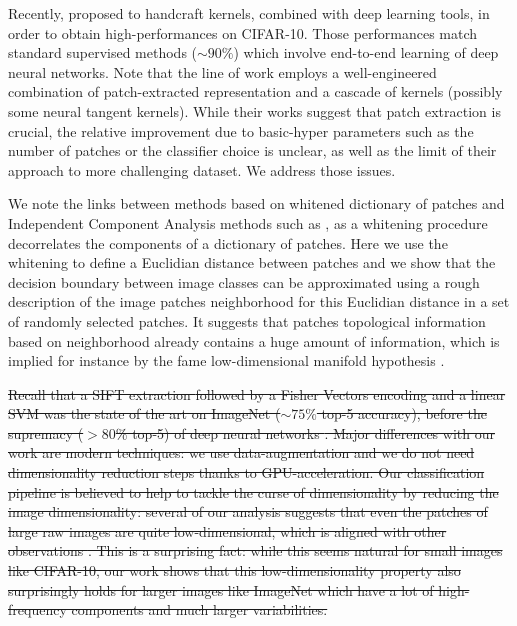 \documentclass{article} %
\begin{document}
Recently, \citep{li2019enhanced,shankar2020neural} proposed to handcraft kernels, combined with deep learning tools, in order to obtain high-performances on CIFAR-10.
Those performances  match standard supervised methods ($\sim 90\%$) which involve end-to-end learning of deep neural networks.
Note that the line of work \citep{li2019enhanced,shankar2020neural,mairal2016end} employs a well-engineered combination of patch-extracted representation and a cascade of kernels (possibly some neural tangent kernels).
While their works suggest that patch extraction is crucial, the relative improvement due to basic-hyper parameters such as the number of patches or the classifier choice is unclear, as well as the limit of their approach to more challenging dataset.
We address those issues.

We  note the links between methods based on whitened dictionary of patches and Independent Component Analysis methods such as \citep{ngiam2010tiled}, as a whitening procedure decorrelates the components of a dictionary of patches.
Here we use the whitening to define a Euclidian distance between patches and we show that the decision boundary between image classes can be approximated using a rough description of the image patches neighborhood for this Euclidian distance in a set of randomly selected patches.
It suggests that patches topological information based on neighborhood already contains a huge amount of information, which is implied for instance by the fame low-dimensional manifold hypothesis 
\citep{fefferman2016testing}.

\sout{Recall that a SIFT extraction \cite{lowe2004distinctive} followed by a Fisher Vectors encoding \citep{sanchez2013image} and a linear SVM was the state of the art on ImageNet ($\sim 75\% $ top-5 accuracy), before the supremacy ($ > 80$\% top-5) of deep neural networks \citet{krizhevsky2012imagenet}.
Major differences with our work are modern techniques: we use data-augmentation and we do not need dimensionality reduction steps thanks to GPU-acceleration.
Our classification pipeline is believed to help to tackle the curse of dimensionality by reducing the image dimensionality: several of our analysis  suggests that even the patches of large raw images are quite low-dimensional, which is aligned with other observations \citep{Oyallon_2017_CVPR}.
This is a surprising fact: while this seems natural for small  images like CIFAR-10, our work shows that this low-dimensionality property also surprisingly holds for larger images like ImageNet which have a lot of high-frequency components and much larger variabilities.}
\end{document}
